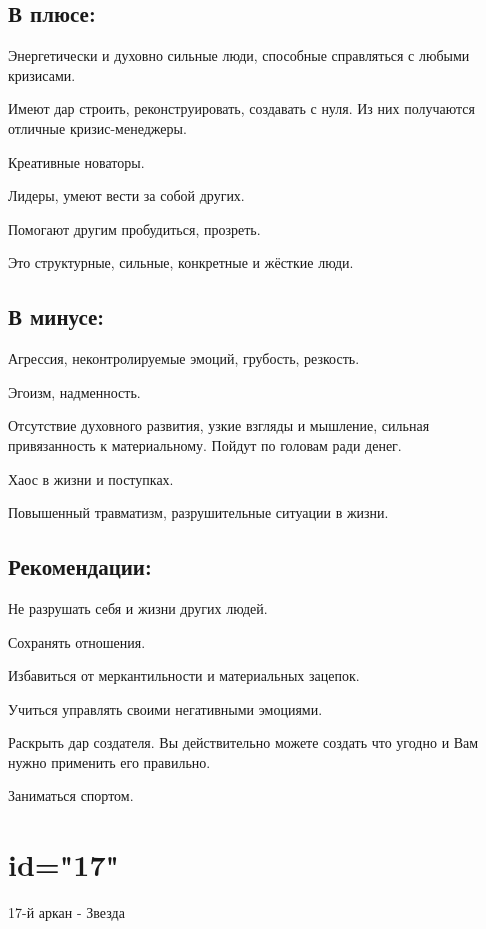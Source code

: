 \subsection{В плюсе:}
\item Энергетически и духовно сильные люди, способные справляться с любыми кризисами.
\item Имеют дар строить, реконструировать, создавать с нуля. Из них получаются отличные кризис-менеджеры.
\item Креативные новаторы.
\item Лидеры, умеют вести за собой других.
\item Помогают другим пробудиться, прозреть.
\item Это структурные, сильные, конкретные и жёсткие люди.
\endsubsection

\subsection{В минусе:}
\item Агрессия, неконтролируемые эмоций, грубость, резкость.
\item Эгоизм, надменность.
\item Отсутствие духовного развития, узкие взгляды и мышление, сильная привязанность к материальному. Пойдут по головам ради денег.
\item Хаос в жизни и поступках.
\item Повышенный травматизм, разрушительные ситуации в жизни.
\endsubsection

\subsection{Рекомендации:}
\item Не разрушать себя и жизни других людей.
\item Сохранять отношения.
\item Избавиться от меркантильности и материальных зацепок.
\item Учиться управлять своими негативными эмоциями.
\item Раскрыть дар создателя. Вы действительно можете создать что угодно и Вам нужно применить его правильно.
\item Заниматься спортом.
\endsubsection

\endsection

\section{id="17"}{17-й аркан - Звезда}

